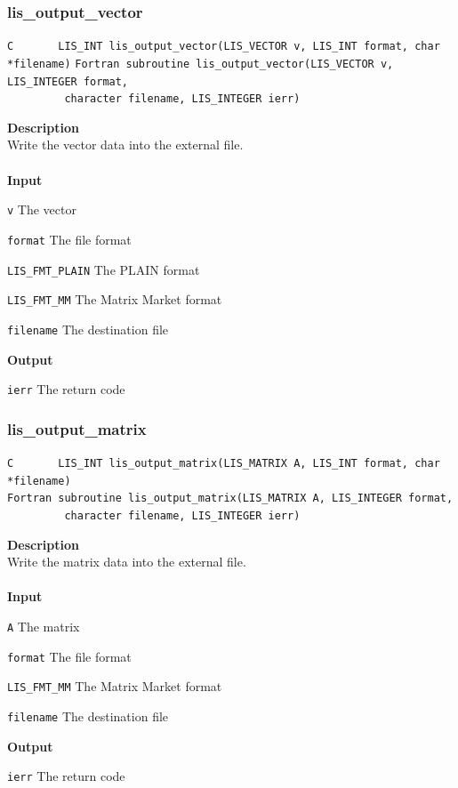 \documentclass[a4paper]{article}
\newcommand{\namelistlabel}[1]{\mbox{#1}\hfill}
\newenvironment{namelist}[1]{%
\begin{list}{}
  {\let\makelabel\namelistlabel
  \settowidth{\labelwidth}{#1}
  \setlength{\leftmargin}{1.1\labelwidth}}
  }{%
\end{list}}
\begin{document}
\subsubsection{lis\_output\_vector}
\begin{screen}
\verb|C       LIS_INT lis_output_vector(LIS_VECTOR v, LIS_INT format, char *filename)|
\verb|Fortran subroutine lis_output_vector(LIS_VECTOR v, LIS_INTEGER format,|\\
\verb|         character filename, LIS_INTEGER ierr) |
\end{screen}
{\bf Description}\\
\indent
Write the vector data into the external file.
\\ \\
\noindent
{\bf Input}
\begin{namelist}{XXXXXXXXXXXXXXXXXXXX}
\item[\tt v] The vector
\item[\tt format] The file format
\begin{namelist}{XXXXXXXXXXXXXXXXXXXX}
\item[\tt LIS\_FMT\_PLAIN] The PLAIN format
\item[\tt LIS\_FMT\_MM] The Matrix Market format
\end{namelist}
\item[\tt filename] The destination file
\end{namelist}
{\bf Output}
\begin{namelist}{XXXXXXXXXXXXXXXXXXXX}
\item[\tt ierr] The return code
\end{namelist}

\subsubsection{lis\_output\_matrix}
\begin{screen}
\verb|C       LIS_INT lis_output_matrix(LIS_MATRIX A, LIS_INT format, char *filename)|\\
\verb|Fortran subroutine lis_output_matrix(LIS_MATRIX A, LIS_INTEGER format,|\\
\verb|         character filename, LIS_INTEGER ierr)|
\end{screen}
{\bf Description}\\
\indent
Write the matrix data into the external file.
\\ \\
\noindent
{\bf Input}
\begin{namelist}{XXXXXXXXXXXXXXXXXXXX}
\item[\tt A] The matrix
\item[\tt format] The file format
\begin{namelist}{XXXXXXXXXXXXXXXXXXXX}
\item[\tt LIS\_FMT\_MM] The Matrix Market format
\end{namelist}
\item[\tt filename] The destination file
\end{namelist}
{\bf Output}
\begin{namelist}{XXXXXXXXXXXXXXXXXXXX}
\item[\tt ierr] The return code
\end{namelist}
\end{document}
